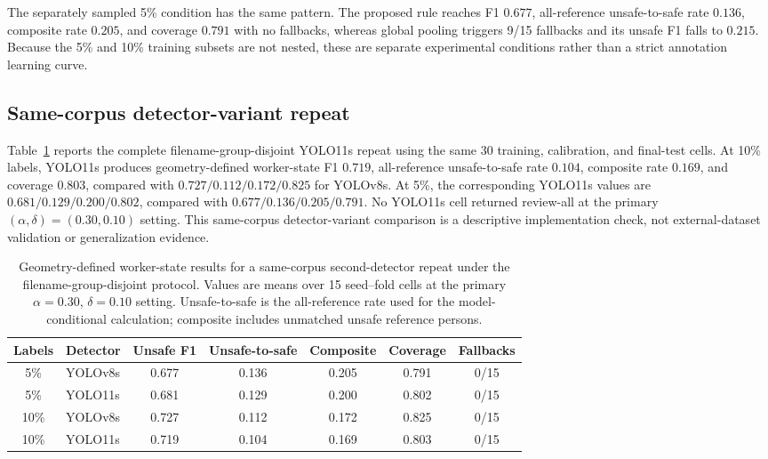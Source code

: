\documentclass[iicol,pdflatex,sn-mathphys-num]{sn-jnl}
\begin{document}
The separately sampled 5\% condition has the same pattern. The proposed rule reaches F1 $0.677$, all-reference unsafe-to-safe rate $0.136$, composite rate $0.205$, and coverage $0.791$ with no fallbacks, whereas global pooling triggers 9/15 fallbacks and its unsafe F1 falls to $0.215$. Because the 5\% and 10\% training subsets are not nested, these are separate experimental conditions rather than a strict annotation learning curve.

\subsection{Same-corpus detector-variant repeat}

Table~\ref{tab:detector_robustness} reports the complete filename-group-disjoint YOLO11s repeat using the same 30 training, calibration, and final-test cells. At 10\% labels, YOLO11s produces geometry-defined worker-state F1 $0.719$, all-reference unsafe-to-safe rate $0.104$, composite rate $0.169$, and coverage $0.803$, compared with $0.727/0.112/0.172/0.825$ for YOLOv8s. At 5\%, the corresponding YOLO11s values are $0.681/0.129/0.200/0.802$, compared with $0.677/0.136/0.205/0.791$. No YOLO11s cell returned review-all at the primary $(\alpha,\delta)=(0.30,0.10)$ setting. This same-corpus detector-variant comparison is a descriptive implementation check, not external-dataset validation or generalization evidence.

\begin{table}[t]
\caption{Geometry-defined worker-state results for a same-corpus second-detector repeat under the filename-group-disjoint protocol. Values are means over 15 seed--fold cells at the primary $\alpha=0.30$, $\delta=0.10$ setting. Unsafe-to-safe is the all-reference rate used for the model-conditional calculation; composite includes unmatched unsafe reference persons.}
\label{tab:detector_robustness}
\centering
\scriptsize
\setlength{\tabcolsep}{5pt}
\begin{tabular}{@{}c l c c c c c@{}}
\toprule
Labels & Detector & Unsafe F1 & Unsafe-to-safe & Composite & Coverage & Fallbacks \\
\midrule
5\%  & YOLOv8s  & 0.677 & 0.136 & 0.205 & 0.791 & 0/15 \\
5\%  & YOLO11s  & 0.681 & 0.129 & 0.200 & 0.802 & 0/15 \\
10\% & YOLOv8s  & 0.727 & 0.112 & 0.172 & 0.825 & 0/15 \\
10\% & YOLO11s  & 0.719 & 0.104 & 0.169 & 0.803 & 0/15 \\
\bottomrule
\end{tabular}
\end{table}
\end{document}
